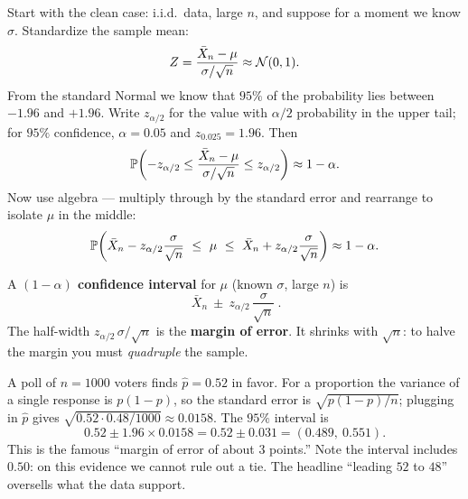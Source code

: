 Start with the clean case: i.i.d.\ data, large $n$, and suppose for a moment we know
$\sigma$. Standardize the sample mean:
\[
  Z = \frac{\bar X_n - \mu}{\sigma/\sqrt n} \approx \Normal(0,1).
\]
From the standard Normal we know that $95\%$ of the probability lies between $-1.96$ and
$+1.96$. Write $z_{\alpha/2}$ for the value with $\alpha/2$ probability in the upper
tail; for $95\%$ confidence, $\alpha = 0.05$ and $z_{0.025} = 1.96$. Then
\[
  \P\!\left(-z_{\alpha/2} \le \frac{\bar X_n - \mu}{\sigma/\sqrt n} \le z_{\alpha/2}\right)
  \approx 1-\alpha .
\]
Now use algebra --- multiply through by the standard error and rearrange to
isolate $\mu$ in the middle:
\[
  \P\!\left(\bar X_n - z_{\alpha/2}\frac{\sigma}{\sqrt n}
  \ \le\ \mu\ \le\
  \bar X_n + z_{\alpha/2}\frac{\sigma}{\sqrt n}\right) \approx 1-\alpha .
\]

\begin{formalbox}
A \textbf{$(1-\alpha)$ confidence interval} for $\mu$ (known $\sigma$, large $n$) is
\[
  \boxed{\ \bar X_n \ \pm\ z_{\alpha/2}\,\frac{\sigma}{\sqrt n}\ } .
\]
The half-width $z_{\alpha/2}\,\sigma/\sqrt n$ is the \textbf{margin of error}. It shrinks
with $\sqrt n$: to halve the margin you must \emph{quadruple} the sample.
\end{formalbox}

\begin{example}
\label{ch32:ex-poll}
A poll of $n=1000$ voters finds $\hat p = 0.52$ in favor. For a proportion the variance
of a single response is $p(1-p)$, so the standard error is $\sqrt{p(1-p)/n}$; plugging
in $\hat p$ gives $\sqrt{0.52\cdot 0.48/1000}\approx 0.0158$. The $95\%$ interval is
\[
  0.52 \pm 1.96 \times 0.0158 = 0.52 \pm 0.031 = (0.489,\ 0.551).
\]
This is the famous ``margin of error of about $3$ points.'' Note the interval includes
$0.50$: on this evidence we cannot rule out a tie. The headline ``leading $52$ to $48$''
oversells what the data support.
\end{example}

